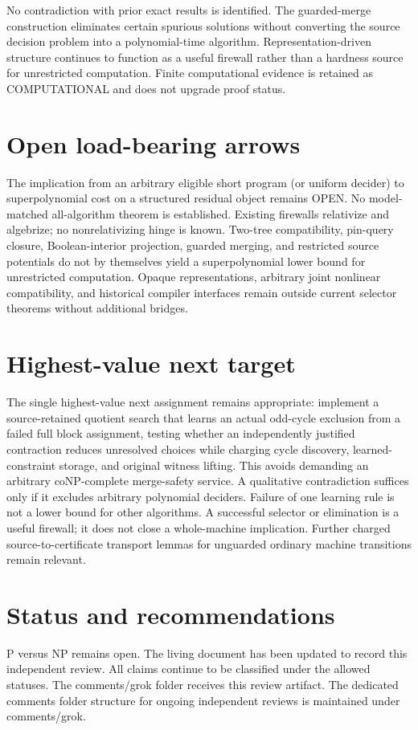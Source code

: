 \documentclass[11pt]{article}
\begin{document}
No contradiction with prior exact results is identified. The guarded-merge construction eliminates certain spurious solutions without converting the source decision problem into a polynomial-time algorithm. Representation-driven structure continues to function as a useful firewall rather than a hardness source for unrestricted computation. Finite computational evidence is retained as COMPUTATIONAL and does not upgrade proof status.

\section{Open load-bearing arrows}
The implication from an arbitrary eligible short program (or uniform decider) to superpolynomial cost on a structured residual object remains OPEN. No model-matched all-algorithm theorem is established. Existing firewalls relativize and algebrize; no nonrelativizing hinge is known. Two-tree compatibility, pin-query closure, Boolean-interior projection, guarded merging, and restricted source potentials do not by themselves yield a superpolynomial lower bound for unrestricted computation. Opaque representations, arbitrary joint nonlinear compatibility, and historical compiler interfaces remain outside current selector theorems without additional bridges.

\section{Highest-value next target}
The single highest-value next assignment remains appropriate: implement a source-retained quotient search that learns an actual odd-cycle exclusion from a failed full block assignment, testing whether an independently justified contraction reduces unresolved choices while charging cycle discovery, learned-constraint storage, and original witness lifting. This avoids demanding an arbitrary coNP-complete merge-safety service. A qualitative contradiction suffices only if it excludes arbitrary polynomial deciders. Failure of one learning rule is not a lower bound for other algorithms. A successful selector or elimination is a useful firewall; it does not close a whole-machine implication. Further charged source-to-certificate transport lemmas for unguarded ordinary machine transitions remain relevant.

\section{Status and recommendations}
P versus NP remains open. The living document has been updated to record this independent review. All claims continue to be classified under the allowed statuses. The comments/grok folder receives this review artifact. The dedicated comments folder structure for ongoing independent reviews is maintained under comments/grok.

\end{document}
